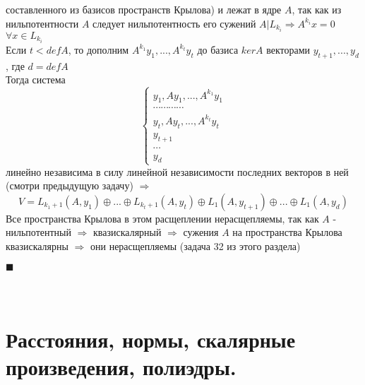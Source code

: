 \documentclass[a4paper,12pt,titlepage,final]{article}
\begin{document}
\begin{itemize}
    составленного из базисов пространств Крылова) и лежат в ядре $A$, так как из нильпотентности $A$ следует 
    нильпотентность его сужений $A|L_{k_i} \Rightarrow A^{k_i}x = 0$ $\forall x \in L_{k_i}$ \\
    Если $t < defA$, то дополним $A^{k_1}y_1, ... , A^{k_t}y_t$ до базиса $kerA$ векторами $y_{t + 1}, ... , y_d$, где 
    $d = defA$ \\
    Тогда система 
    $$
    \begin{cases}
        y_1, Ay_1, ... , A^{k_1} y_1 \\
        \cdots \cdots \cdots \cdots \\
        y_t , Ay_t, ... , A^{k_t} y_t \\
        y_{t + 1} \\
        \cdots \\
        y_d
    \end{cases}
    $$
    линейно независима в силу линейной независимости последних векторов в ней (смотри предыдущую задачу) $\Rightarrow$ 
    $$V = L_{k_1 + 1}(A, y_1) \oplus ... \oplus L_{k_t + 1}(A, y_t) \oplus L_1(A, y_{t + 1}) \oplus ... \oplus L_1(A, y_d)$$
    Все пространства Крылова в этом расщеплении нерасщепляемы, так как $A$ - нильпотентный $\Rightarrow$ квазискалярный $\Rightarrow$ 
    сужения $A$ на пространства Крылова квазискалярны $\Rightarrow$ они нерасщепляемы (задача 32 из этого раздела)
\end{itemize}
$\blacksquare$ \\ \\ \\



\newpage
\section*{Расстояния, нормы, скалярные произведения, полиэдры.}
\end{document}

